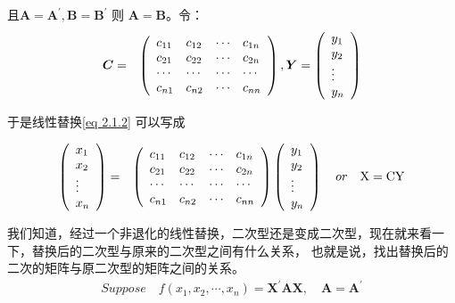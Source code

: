 \begin{enumerate}[ 1) ]
		且$ \boldsymbol{A} = \boldsymbol{A^{\prime}}, \boldsymbol{B} = \boldsymbol{B^{\prime}} $ 
		 则 $ \boldsymbol{A} = \boldsymbol{B} $。令：
        \begin{eqnarray}
			\boldsymbol{C} & = & \left(
				\begin{array}{llll}
					c_{11} & c_{12} & \cdots & c_{1 n} \\
					c_{21} & c_{22} & \cdots & c_{2 n} \\
					\cdots & \cdots & \cdots & \cdots \\
					c_{n 1} & c_{n 2} & \cdots & c_{n n}
				\end{array}\right), 
				\boldsymbol{Y}  =  \left(
				\begin{array}{l}
					y_{1} \\
					y_{2} \\
					\vdots \\
					y_{n}
				\end{array}\right)  \notag 
        \end{eqnarray}
        
        于是线性替换\eqref{eq 2.1.2} 可以写成
        
        \begin{eqnarray}
			\left(
				\begin{array}{l}
					x_{1} \\
					x_{2} \\
					\vdots \\
					x_{n}
				\end{array}\right) & = & \left(
				\begin{array}{llll}
					c_{11} & c_{12} & \cdots & c_{1 n} \\
					c_{21} & c_{22} & \cdots & c_{2 n} \\
					\cdots & \cdots & \cdots & \cdots \\
					c_{n 1} & c_{n 2} & \cdots & c_{n n}
				\end{array}\right)\left(
				\begin{array}{l}
					y_{1} \\
					y_{2} \\
					\vdots \\
					y_{n}
				\end{array}\right) \quad or \quad \rm \boldsymbol{X}=\boldsymbol{CY} \notag
        \end{eqnarray}
        
		\setlength{\parindent}{2\ccwd}  我们知道，经过一个非退化的线性替换，二次型还是变成二次型，现在就来看一下，替换后的二次型与原来的二次型之间有什么关系，
		也就是说，找出替换后的二次的矩阵与原二次型的矩阵之间的关系。
        \begin{eqnarray}
			Suppose \quad f\left(x_{1}, x_{2}, \cdots, x_{n}\right)  = \boldsymbol{X^{\prime}} \boldsymbol{A} \boldsymbol{X} , \quad \boldsymbol{A}   
			=  \boldsymbol{A^{\prime}}  \label{eq 2.1.5}
        \end{eqnarray}
        

\end{enumerate}
